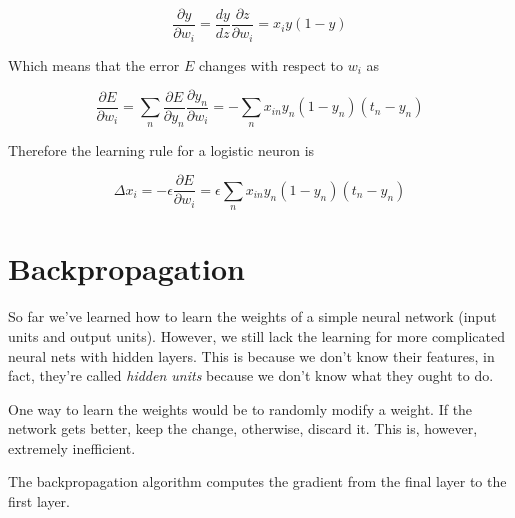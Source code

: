 \documentclass[a4paper]{article}
\begin{document}
\[
    \frac{\partial y}{\partial w_i}=\frac{dy}{dz}\frac{\partial z}{\partial w_i}=x_i y(1-y)
\]

Which means that the error \(E\) changes with respect to \(w_i\) as

\[
    \frac{\partial E}{\partial w_i} =
    \sum_n \frac{\partial E}{\partial y_n} \frac{\partial y_n}{\partial w_i} =
    -\sum_n x_{in} y_n (1-y_n)(t_n-y_n)
\]

Therefore the learning rule for a logistic neuron is

\[
    \Delta x_i = -\epsilon \frac{\partial E}{\partial w_i}=\epsilon \sum_n x_{in} y_n (1-y_n)(t_n-y_n)
\]


\pagebreak

\section{Backpropagation}

So far we've learned how to learn the weights of a simple neural network (input units and output units).
However, we still lack the learning for more complicated neural nets with hidden layers.
This is because we don't know their features, in fact, they're called \textit{hidden units}
because we don't know what they ought to do.

One way to learn the weights would be to randomly modify a weight. If the network
gets better, keep the change, otherwise, discard it. This is, however, extremely
inefficient.

The backpropagation algorithm computes the gradient from the final layer to the first layer.

\end{document}
